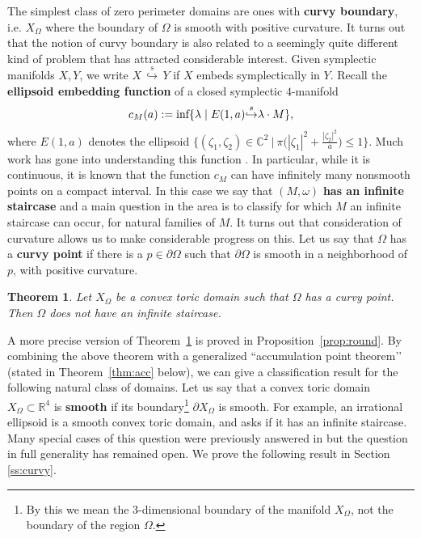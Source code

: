 \documentclass[11pt, reqno]{amsart}
\newtheorem{thm}{Theorem}[subsection]
\theoremstyle{remark}
\numberwithin{equation}{subsection}
\numberwithin{figure}{section}
\theoremstyle{customremark}
\newcommand{\se}{{\stackrel{s}\hookrightarrow}}
\newcommand{\Om}{{\Omega}}
\newcommand{\p}{{\partial}}
\newcommand{\C}{\mathbb{C}}
\begin{document}
 
The simplest class of zero perimeter domains are ones with {\bf curvy boundary}, i.e. $X_{\Omega}$ where the boundary of $\Omega$ is smooth with positive curvature. 
  It turns out that the notion of curvy boundary is also related to a seemingly quite different kind of problem that has attracted considerable interest.  Given symplectic manifolds $X,Y$, we write $X \,\se\,Y$ if  $X$ embeds symplectically in $Y$. Recall the {\bf ellipsoid embedding function} of a closed symplectic $4$-manifold 
\begin{align}\label{eq:ellcap}
 c_M(a) := \text{inf} \lbrace \lambda \hspace{1 mm} | \hspace{1 mm} E(1,a) \se \lambda \cdot M \rbrace,
 \end{align} 
where $E(1,a)$ denotes the ellipsoid $\bigl\{(\zeta_1,\zeta_2)\in \C^2 \ \big| \ \pi\bigl( |\zeta_1|^2+\frac{|\zeta_2|^2}a \bigr) \le 1\bigr\}.$
Much work has gone into understanding this function \cite{ball,CG2,AADT,MMW,BHM,Usher}.   
In particular, while it is continuous, it is known that  the function $c_M$ can have infinitely many nonsmooth points on a compact interval.  In this case we say that $(M,\omega)$ {\bf has an infinite staircase} and a main question in the area is to classify for which $M$ an infinite staircase can occur, for natural families of $M$.
It turns out that consideration of curvature allows us to make considerable progress on this.
 Let us say that $\Omega$ has a {\bf curvy point} if there is a $p \in \partial \Omega$ such that $\partial \Omega$ is smooth in a neighborhood of $p$, with positive curvature.

\begin{thm}
\label{thm:curvy}
Let $X_{\Omega}$ be a convex toric domain such that $\Omega$ has a curvy point.  Then $\Omega$ does not have an infinite staircase.
\end{thm}  


A more precise version of Theorem~\ref{thm:curvy} is proved in Proposition~\ref{prop:round}.
By combining the above theorem with 
a generalized ``accumulation point theorem\rq\rq\, (stated in Theorem~\ref{thm:acc} below), we can give a classification result for the following natural class of domains.  Let us say that a convex toric domain $X_{\Omega} \subset \mathbb{R}^4$ is {\bf smooth} if its boundary\footnote
{
By this we mean the $3$-dimensional boundary of the manifold $X_\Om$,  not the boundary of the region $\Om$.}
 $\p X_{\Omega} $ is
smooth.
 For example, an irrational ellipsoid is a smooth convex toric domain, and \cite[Qu.1.4]{CG} asks if it has an infinite staircase.  Many special cases of this question were previously answered in \cite{salinger} but the question in full generality has remained open. We prove the following result in Section \ref{ss:curvy}.
\end{document}
